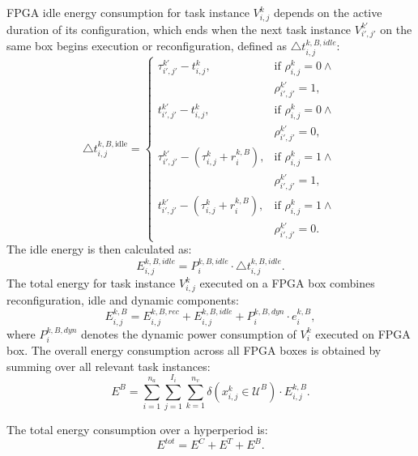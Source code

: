 \documentclass{IEEEtaes}
\begin{document}
FPGA idle energy consumption for task instance $V_{i,j}^{k}$ depends on the active duration of its configuration, which ends when the next task instance $V_{i',j'}^{k'}$ on the same box begins execution or reconfiguration, defined as $\triangle t^{k,B,idle}_{i,j}$:
\begin{equation}
    \triangle t^{k,B,\text{idle}}_{i,j} =
    \begin{cases}
        \tau_{i',j'}^{k'} - t_{i,j}^{k}, & \text{if } \rho_{i,j}^k=0\land \\ 
        &\rho_{i',j'}^{k'}=1, \\
        t_{i',j'}^{k'} - t_{i,j}^{k}, & \text{if } \rho_{i,j}^k=0 \land\\ 
        &\rho_{i',j'}^{k'}=0, \\
        \tau_{i',j'}^{k'} - (\tau_{i,j}^{k}+r_i^{k,B}), & \text{if } \rho_{i,j}^k=1\land \\ 
        &\rho_{i',j'}^{k'}=1, \\
        t_{i',j'}^{k'} - (\tau_{i,j}^{k}+r_i^{k,B}), & \text{if } \rho_{i,j}^k=1\land \\ 
        &\rho_{i',j'}^{k'}=0. 
    \end{cases}
\end{equation}
The idle energy is then calculated as:
\begin{equation}
    E^{k,B,idle}_{i,j}=P^{k,B,idle}_{i}\cdot \triangle t^{k,B,idle}_{i,j}.
    \label{equ:idle energy for instance}
\end{equation}
The total energy for task instance $V_{i,j}^{k}$ executed on a FPGA box combines reconfiguration, idle and dynamic components:
\begin{equation}
    E^{k,B}_{i,j}=E_{i,j}^{k,B,rec} + E^{k,B,idle}_{i,j}+P^{k,B,dyn}_{i}\cdot e^{k,B}_{i},
\end{equation}
where $P^{k,B,dyn}_{i}$ denotes the dynamic power consumption of $V_{i}^{k}$ executed on FPGA box. The overall energy consumption across all FPGA boxes is obtained by summing over all relevant task instances:
\begin{equation}
    E^B=\sum_{i=1}^{n_a}\sum_{j=1}^{I_i}\sum_{k=1}^{n_v} \delta(x_{i,j}^k \in \mathcal{U}^B) \cdot E^{k,B}_{i,j}.
\end{equation}

The total energy consumption over a hyperperiod is:
\begin{equation}
    E^{tot}= E^C+E^T+E^B.
\label{equ:total energy}
\end{equation}
\end{document}
